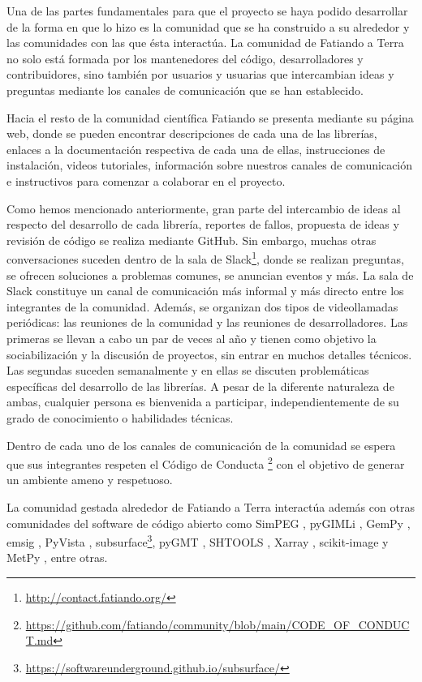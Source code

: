 Una de las partes fundamentales para que el proyecto se haya podido desarrollar
de la forma en que lo hizo es la comunidad que se ha construido a su alrededor
y las comunidades con las que ésta interactúa.
La comunidad de Fatiando a Terra no solo está formada por los mantenedores del
código, desarrolladores y contribuidores, sino también por usuarios
y usuarias que intercambian ideas y preguntas mediante los canales de
comunicación que se han establecido.

Hacia el resto de la comunidad científica Fatiando se presenta mediante su
página web, donde se pueden encontrar descripciones de cada una de las
librerías, enlaces a la documentación respectiva de cada una de ellas,
instrucciones de instalación, videos tutoriales, información sobre nuestros
canales de comunicación e instructivos para comenzar a colaborar en el
proyecto.

Como hemos mencionado anteriormente, gran parte del intercambio de ideas al
respecto del desarrollo de cada librería, reportes de fallos, propuesta de
ideas y revisión de código se realiza mediante GitHub.
Sin embargo, muchas otras conversaciones suceden dentro de la sala de
Slack\footnote{\url{http://contact.fatiando.org/}}, donde se realizan
preguntas, se ofrecen soluciones a problemas comunes, se anuncian eventos
y más.
La sala de Slack constituye un canal de comunicación más informal y más
directo entre los integrantes de la comunidad.
Además, se organizan dos tipos de videollamadas periódicas: las reuniones de la
comunidad y las reuniones de desarrolladores.
Las primeras se llevan a cabo un par de veces al año y tienen como objetivo la
sociabilización y la discusión de proyectos, sin entrar en muchos detalles
técnicos.
Las segundas suceden semanalmente y en ellas se discuten problemáticas
específicas del desarrollo de las librerías.
A pesar de la diferente naturaleza de ambas, cualquier persona es bienvenida
a participar, independientemente de su grado de conocimiento o habilidades
técnicas.

Dentro de cada uno de los canales de comunicación de la comunidad se espera
que sus integrantes respeten el Código de
Conducta%
\footnote{%
    \url{https://github.com/fatiando/community/blob/main/CODE_OF_CONDUCT.md}%
}
con el objetivo de generar un ambiente ameno y respetuoso.

La comunidad gestada alrededor de Fatiando a Terra interactúa además con otras
comunidades del software de código abierto como SimPEG \citep{cockett2015},
pyGIMLi \citep{ruecker2017}, GemPy \citep{varga2019}, emsig
\citep{werthmuller2017,werthmuller2019}, PyVista \citep{sullivan2019},
subsurface\footnote{\url{https://softwareunderground.github.io/subsurface/}},
pyGMT \citep{pygmt2020}, SHTOOLS \citep{wieczorek2018}, Xarray
\citep{xarray2017}, scikit-image \citep{skimage} y MetPy \citep{metpy}, entre
otras.

